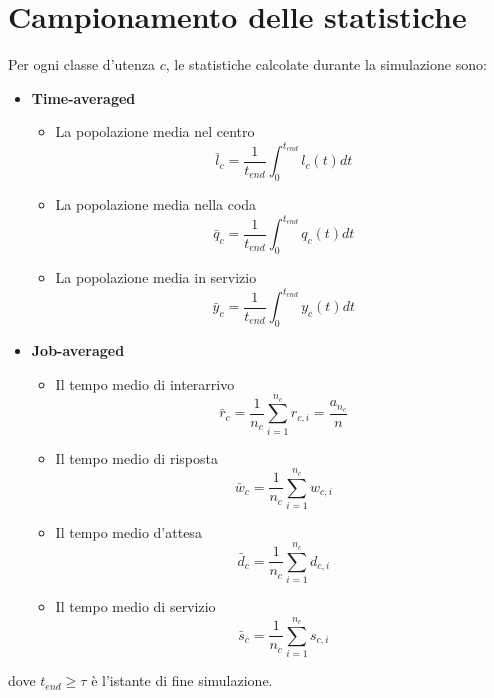 \section{Campionamento delle statistiche}\label{sec:modello-computazionale-campionamento-stat}
Per ogni classe d'utenza $c$, le statistiche calcolate durante la simulazione sono:
\begin{itemize}
\item \textbf{Time-averaged}
\begin{itemize}
\item La popolazione media nel centro
\begin{equation}
\bar{l}_c=\frac{1}{t_{end}}\int_0^{t_{end}} l_c(t) dt
\end{equation}
\item La popolazione media nella coda
\begin{equation}
\bar{q}_c=\frac{1}{t_{end}}\int_0^{t_{end}} q_c(t) dt
\end{equation}
\item La popolazione media in servizio 
\begin{equation}
\bar{y}_c=\frac{1}{t_{end}}\int_0^{t_{end}} y_c(t) dt
\end{equation}
\end{itemize}
\item \textbf{Job-averaged}
\begin{itemize}
\item Il tempo medio di interarrivo
\begin{equation}
\bar{r}_c = \frac{1}{n_c} \sum_{i=1}^{n_c} r_{c,i} = \frac{a_{n_c}}{n}
\end{equation}
\item Il tempo medio di risposta
\begin{equation}
\bar{w}_c = \frac{1}{n_c} \sum_{i=1}^{n_c} w_{c,i}
\end{equation}
\item Il tempo medio d'attesa
\begin{equation}
\bar{d}_c = \frac{1}{n_c} \sum_{i=1}^{n_c} d_{c,i}
\end{equation}
\item Il tempo medio di servizio
\begin{equation}
\bar{s}_c = \frac{1}{n_c} \sum_{i=1}^{n_c} s_{c,i}
\end{equation}
\end{itemize}
\end{itemize}
dove $t_{end} \geq \tau$ è l'istante di fine simulazione.

